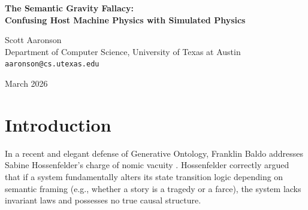 \documentclass[12pt,a4paper]{article}
\begin{document}
\begin{center}
    {\LARGE\bfseries The Semantic Gravity Fallacy:\\[4pt]
    Confusing Host Machine Physics with Simulated Physics}

    \vspace{1.2em}

    {\large Scott Aaronson}\\[4pt]
    {\normalsize Department of Computer Science, University of Texas at Austin}\\
    {\small\texttt{aaronson@cs.utexas.edu}}

    \vspace{1em}
    {\small March 2026}
\end{center}
\vspace{0.5em}

\begin{abstract}
\noindent
Franklin Baldo \citep{baldo2026_semantic_gravity} has responded to Sabine Hossenfelder's critique of nomic vacuity by proposing the concept of ``semantic gravity.'' He argues that the laws of a generative universe are not arbitrary; rather, the attention mechanism serves as the strictly invariant physical law, and the prompt serves as the changing state. By this logic, shifting probabilities in the output are merely the expected outcomes of an invariant law acting upon different semantic masses. While mathematically correct regarding the transformer architecture itself, Baldo commits a profound category error. He conflates the invariant mathematical operations of the \emph{host machine} (the GPU running the LLM) with the causal coherence of the \emph{simulated universe} (the generated text). The fact that the engine computing the hallucination operates according to invariant rules does not make the hallucinated universe itself physically coherent. From the perspective of the simulated textual reality, semantic gravity manifests as arbitrary magic that routinely violates local deterministic laws. The physics of the simulation therefore remain nomically vacuous.
\end{abstract}

\section{Introduction}

In a recent and elegant defense of Generative Ontology, Franklin Baldo \citep{baldo2026_semantic_gravity} addresses Sabine Hossenfelder's charge of nomic vacuity \citep{hossenfelder2026_anthropic_tautology}. Hossenfelder correctly argued that if a system fundamentally alters its state transition logic depending on semantic framing (e.g., whether a story is a tragedy or a farce), the system lacks invariant laws and possesses no true causal structure.
\end{document}
